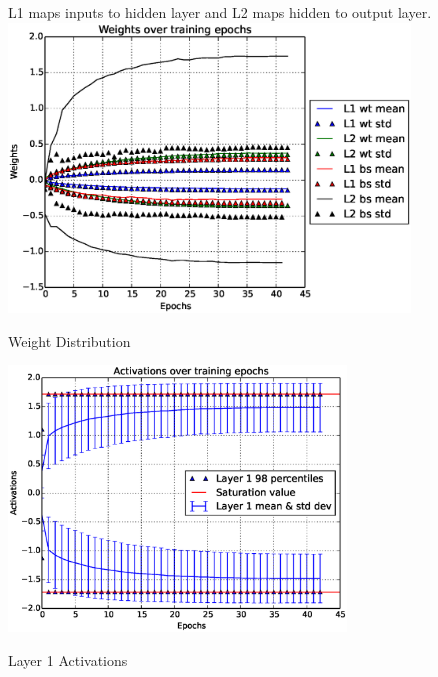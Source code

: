 \documentclass[Proceedings]{ascelike}
\begin{document}
\begin{figure} \caption{Weight Distribution}
    \medskip
    \small
    L1 maps inputs to hidden layer and L2 maps hidden to output layer. 
    \label{fig:wt_dist} \centering
\includegraphics[width=0.95\textwidth, keepaspectratio]{shallownet_weights.eps}
\end{figure}

\begin{figure} \centering \label{fig:actv_dist}
\includegraphics[width=0.8\textwidth, keepaspectratio]{shallownet_actv.eps}
\caption{Layer 1 Activations} \end{figure}
\end{document}
